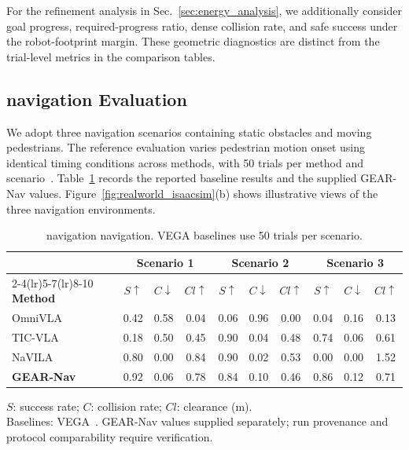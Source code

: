 \documentclass[letterpaper, 10 pt, conference]{ieeeconf}  %
\begin{document}
For the refinement analysis in Sec.~\ref{sec:energy_analysis}, we additionally
consider goal progress, required-progress ratio, dense collision rate, and
safe success under the robot-footprint margin. These geometric diagnostics
are distinct from the trial-level metrics in the comparison tables.

\subsection{navigation Evaluation}
\label{sec:navigation}

We adopt three navigation scenarios containing static obstacles and moving
pedestrians. The reference evaluation varies pedestrian motion onset using
identical timing conditions across methods, with 50 trials per method and
scenario~\cite{vega}. Table~\ref{tab:isaac_sim} records the reported baseline
results and the supplied GEAR-Nav values.
Figure~\ref{fig:realworld_isaacsim}(b) shows illustrative views of the three
navigation environments.

\begin{table}[!tb]
\centering
\caption{navigation navigation. VEGA baselines use 50 trials per scenario.}
\label{tab:isaac_sim}
\footnotesize
\setlength{\tabcolsep}{2pt}
\renewcommand{\arraystretch}{1.08}
\begin{tabular*}{\columnwidth}{@{\extracolsep{\fill}}lccc@{\hspace{7pt}}ccc@{\hspace{7pt}}ccc@{}}
\toprule
& \multicolumn{3}{c}{\textbf{Scenario 1}}
& \multicolumn{3}{c}{\textbf{Scenario 2}}
& \multicolumn{3}{c}{\textbf{Scenario 3}} \\
\cmidrule(lr){2-4}\cmidrule(lr){5-7}\cmidrule(lr){8-10}
\textbf{Method}
& $S\uparrow$ & $C\downarrow$ & $Cl\uparrow$
& $S\uparrow$ & $C\downarrow$ & $Cl\uparrow$
& $S\uparrow$ & $C\downarrow$ & $Cl\uparrow$ \\
\midrule
OmniVLA
& 0.42 & 0.58 & 0.04
& 0.06 & 0.96 & 0.00
& 0.04 & 0.16 & 0.13 \\
TIC-VLA
& 0.18 & 0.50 & 0.45
& 0.90 & 0.04 & 0.48
& 0.74 & 0.06 & 0.61 \\
NaVILA
& 0.80 & 0.00 & 0.84
& 0.90 & 0.02 & 0.53
& 0.00 & 0.00 & 1.52 \\
\midrule
\textbf{GEAR-Nav}
& 0.92 & 0.06 & 0.78
& 0.84 & 0.10 & 0.46
& 0.86 & 0.12 & 0.71 \\
\bottomrule
\end{tabular*}
\par\vspace{2pt}
\parbox{\columnwidth}{\scriptsize\raggedright
$S$: success rate; $C$: collision rate; $Cl$: clearance (m).\\
Baselines: VEGA~\cite{vega}. GEAR-Nav values supplied separately; run provenance and protocol comparability require verification.}
\end{table}
\end{document}
